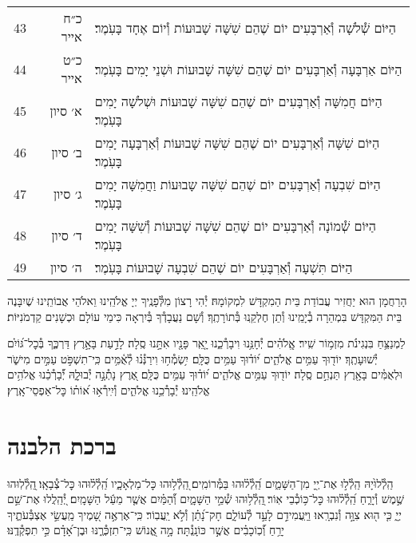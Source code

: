 \documentclass[twoside, openany, parskip=half, 11pt]{book}
\begin{document}
\begin{scriptsize}
\begin{longtable}{ l | r | p{} }
43 & כ״ח אייר & הַיּוֹם שְׁ֯לֹשָׁה וְ֯אַרְבָּעִים יוֹם שֶׁהֵם שִׁשָּׁה שָׁבוּעוֹת וְ֯יוֹם אֶחָד בָּעֹֽמֶר׃ \\
44 & כ״ט אייר & הַיּוֹם אַרְבָּעָה וְ֯אַרְבָּעִים יוֹם שֶׁהֵם שִׁשָּׁה שָׁבוּעוֹת וּשְׁנֵי יָמִים בָּעֹֽמֶר׃ \\
45 & א׳ סיון & הַיּוֹם חֲמִשָּׁה וְ֯אַרְבָּעִים יוֹם שֶׁהֵם שִׁשָּׁה שָׁבוּעוֹת וּשְׁלֹשָׁה יָמִים בָּעֹֽמֶר׃ \\
46 & ב׳ סיון & הַיּוֹם שִׁשָּׁה וְ֯אַרְבָּעִים יוֹם שֶׁהֵם שִׁשָּׁה שָׁבוּעוֹת וְ֯אַרְבָּעָה יָמִים בָּעֹֽמֶר׃ \\
47 & ג׳ סיון & הַיּוֹם שִׁבְעָה וְ֯אַרְבָּעִים יוֹם שֶׁהֵם שִׁשָּׁה שָבוּעוֹת וַחֲמִשָּׁה יָמִים בָּעֹֽמֶר׃ \\
48 & ד׳ סיון & הַיּוֹם שְׁ֯מוֹנָה וְ֯אַרְבָּעִים יוֹם שֶׁהֵם שִׁשָּׁה שָׁבוּעוֹת וְ֯שִׁשָּׁה יָמִים בָּעֹֽמֶר׃ \\
49 & ה׳ סיון & הַיּוֹם תִּשְׁעָה וְ֯אַרְבָּעִים יוֹם שֶׁהֵם שִׁבְעָה שָׁבוּעוֹת בָּעֹֽמֶר׃
\end{longtable}
\end{scriptsize}



הָרַחֲמָן הוּא יַחֲזִיר עֲבוֹדַת בֵּית הַמִקְדָּשׁ לִמְקוֹמָהּ׃
יְ֯הִי רָצוֹן מִלְּ֯פָנֶֽיךָ יְיָ אֱלֹהֵֽינוּ וֵאלֹהֵי אֲבוֹתֵֽינוּ שֶׁיִבָּנֶה בֵּית הַמִּקְדָּשׁ בִּמְהֵרָה בְ֯יָמֵֽינוּ וְ֯תֵן חֶלְקֵֽנוּ בְּ֯תוֹרָתֶֽךָ׃ וְ֯שָׁם נַעֲבָדְ֯ךָ בְּ֯יִרְאָה כִּימֵי עוֹלָם וּכְשָׁנִים קַדְמֹנִיּוֹת׃


לַמְנַצֵּ֥חַ בִּנְגִינֹ֗ת מִזְמ֥וֹר שִֽׁיר׃ אֱֽלֹהִ֗ים יְ֯חָנֵּ֥נוּ וִיבָרְ֯כֵ֑נוּ יָ֤אֵֽר פָּנָ֖יו אִתָּ֣נוּ סֶֽלָה׃ לָדַ֣עַת בָּאָ֣רֶץ דַּרְכֶּ֑ךָ בְּ֯כׇל־גּ֝וֹיִ֗ם יְ֯שׁוּעָתֶֽךָ׃ יוֹד֖וּךָ עַמִּ֥ים אֱלֹהִ֑ים י֝וֹד֗וּךָ עַמִּ֥ים כֻּלָּֽם׃ יִ֥שְׂמְ֯ח֥וּ וִירַנְּ֯נ֗וּ לְ֯אֻ֫מִּ֥ים כִּֽי־תִשְׁפֹּ֣ט עַמִּ֣ים מִישֹׁ֑ר וּלְאֻמִּ֓ים בָּאָ֖רֶץ תַּנְחֵ֣ם סֶֽלָה׃ יוֹד֖וּךָ עַמִּ֥ים אֱלֹהִ֑ים י֝וֹד֗וּךָ עַמִּ֥ים כֻּלָּֽם׃ אֶ֭רֶץ נָתְ֯נָ֣ה יְ֯בוּלׇ֑הּ יְ֯֝בָרְ֯כֵ֗נוּ אֱלֹהִ֥ים
אֱלֹהֵֽינוּ׃ יְ֯בָרְ֯כֵ֥נוּ אֱלֹהִ֑ים וְ֯יִֽירְ֯א֥וּ א֝וֹת֗וֹ כׇּל־אַפְסֵי־אָֽרֶץ׃

\section[ברכת הלבנה]{ ברכת הלבנה }

הַֽלְ֯לוּ֙יָהּ הַֽלְ֯ל֣וּ אֶת־יְ֖יָ מִן־הַשָּׁמַ֑יִם הַֽ֝לְ֯ל֗וּהוּ בַּמְּ֯רוֹמִֽים׃
֭הַֽלְ֯ל֥וּהוּ כׇּל־מַלְאָכָ֑יו הַֽ֝לְ֯ל֗וּהוּ כׇּל־צְ֯בָאָֽו׃
֖הַֽלְ֯לֽוּהוּ שֶׁ֣מֶשׁ וְ֯יָרֵ֑חַ הַֽ֝לְ֯ל֗וּהוּ כׇּל־כּ֥וֹכְ֯בֵי אֽוֹר׃
֖הַֽלְ֯ל֥וּהוּ שְׁ֯מֵ֣י הַשָּׁמָ֑יִם וְ֝֯הַמַּ֗יִם אֲשֶׁ֤ר מֵעַ֬ל הַשָּׁמָֽיִם׃
יְ֭֯הַֽלֲלוּ אֶת־שֵׁ֣ם יְיָ֑ כִּ֤י ה֖וּא צִוָּ֣ה וְ֯נִבְרָֽאוּ׃
וַיַּֽעֲמִידֵ֣ם לָעַ֣ד לְ֯עוֹלָ֑ם חָק־נָ֝תַ֗ן וְ֯לֹ֣א יַֽעֲבֽוֹר׃
כִּֽי־אֶרְאֶ֣ה שָׁ֭מֶיךָ מַֽעֲשֵׂ֣י אֶצְבְּ֯עֹתֶ֑יךָ יָרֵ֥חַ וְ֝֯כֽוֹכָבִ֗ים אֲשֶׁ֣ר כּוֹנָֽנְ֯תָּה׃
מָ֣ה אֱ֭נוֹשׁ כִּֽי־תִזְכְּ֯רֶ֑נּוּ וּבֶן־אָ֝דָ֗ם כִּ֣י תִפְקְ֯דֶֽנּוּ׃
\end{document}
